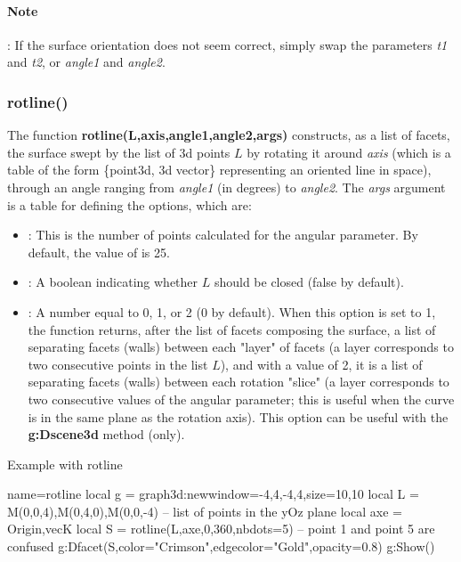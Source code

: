 \paragraph{Note}: If the surface orientation does not seem correct, simply swap the parameters \emph{t1} and \emph{t2}, or \emph{angle1} and \emph{angle2}.

\subsubsection{rotline()}

The function \textbf{rotline(L,axis,angle1,angle2,args)} constructs, as a list of facets, the surface swept by the list of 3d points $L$ by rotating it around \emph{axis} (which is a table of the form \{point3d, 3d vector\} representing an oriented line in space), through an angle ranging from \emph{angle1} (in degrees) to \emph{angle2}. The \emph{args} argument is a table for defining the options, which are:
\begin{itemize}
    \item {}: This is the number of points calculated for the angular parameter. By default, the value of  is 25.

    \item {}: A boolean indicating whether $L$ should be closed (false by default).

    \item {}: A number equal to 0, 1, or 2 (0 by default). When this option is set to 1, the function returns, after the list of facets composing the surface, a list of separating facets (walls) between each "layer" of facets (a layer corresponds to two consecutive points in the list $L$), and with a value of 2, it is a list of separating facets (walls) between each rotation "slice" (a layer corresponds to two consecutive values ​​of the angular parameter; this is useful when the curve is in the same plane as the rotation axis). This option can be useful with the \textbf{g:Dscene3d} method (only).
\end{itemize}

\begin{demo}{Example with rotline}
\begin{luadraw}{name=rotline}
local g = graph3d:new{window={-4,4,-4,4},size={10,10}}
local L = {M(0,0,4),M(0,4,0),M(0,0,-4)} -- list of points in the yOz plane
local axe = {Origin,vecK}
local S = rotline(L,axe,0,360,{nbdots=5}) -- point 1 and point 5 are confused
g:Dfacet(S,{color="Crimson",edgecolor="Gold",opacity=0.8})
g:Show()
\end{luadraw}
\end{demo}      


